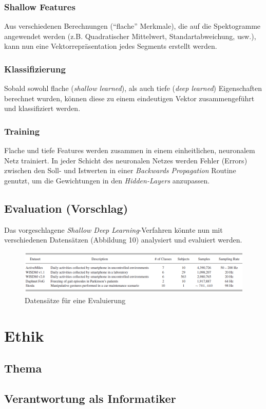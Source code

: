 \documentclass[11pt]{article}
\begin{document}
    \subsubsection{Shallow Features}
    Aus verschiedenen Berechnungen ("`flache"' Merkmale), die auf die Spektogramme angewendet werden
    (z.B. Quadratischer Mittelwert, Standartabweichung, usw.), kann nun eine Vektorrepräsentation
    jedes Segments erstellt werden.

    \subsubsection{Klassifizierung}
    Sobald sowohl flache (\textit{shallow learned}), als auch tiefe (\textit{deep learned})
    Eigenschaften berechnet wurden, können diese zu einem eindeutigen Vektor zusammengeführt und
    klassifiziert werden.

    \subsubsection{Training}
    Flache und tiefe Features werden zusammen in einem einheitlichen, neuronalem Netz trainiert. In
    jeder Schicht des neuronalen Netzes werden Fehler (Errors) zwischen den Soll- und Istwerten in
    einer \textit{Backwards Propagation} Routine genutzt, um die Gewichtungen in den
    \textit{Hidden-Layers} anzupassen.

    \subsection{Evaluation (Vorschlag)}
    Das vorgeschlagene \textit{Shallow Deep Learning}-Verfahren könnte nun mit verschiedenen Datensätzen
    (Abbildung 10) analysiert und evaluiert werden.

    \begin{figure}[ht!]
        \centerings
        \includegraphics[width=16cm]{../../resources/datasets.png}
        \caption{Datensätze für eine Evaluierung}
    \end{figure}

    \newpage

    \section{Ethik}

    \subsection{Thema}

    \subsection{Verantwortung als Informatiker}

    \newpage

    
    
\end{document}
